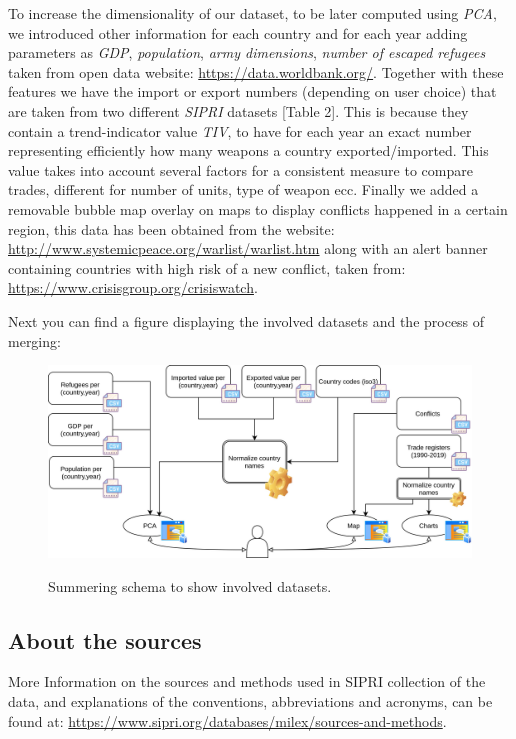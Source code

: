 \documentclass{article}
\begin{document}
\begin{multicols}{2}
To increase the dimensionality of our dataset, to be later computed using \textit{PCA}, we introduced other information for each country and for each year adding parameters as \textit{GDP}, \textit{population}, \textit{army dimensions}, \textit{number of escaped refugees} taken from open data website: \url{https://data.worldbank.org/}. 
Together with these features we have the import or export numbers (depending on user choice) that are taken from two different \textit{SIPRI} datasets [Table 2]. This is because they contain a trend-indicator value \textit{TIV}, to have for each year an exact number representing efficiently how many weapons a country exported/imported. This value takes into account several factors for a consistent measure to compare trades, different for number of units, type of weapon ecc.
Finally we added a removable bubble map overlay on maps to display conflicts happened in a certain region, this data has been obtained from the website: \url{http://www.systemicpeace.org/warlist/warlist.htm} along with an alert banner containing countries with high risk of a new conflict, taken from:  \url{https://www.crisisgroup.org/crisiswatch}.  





Next you can find a figure displaying the involved datasets and the process of merging:

\begin{figure}[H]

		\centering
	\includegraphics[scale=0.07,center]{./fig/vaBigDataIcons2.jpg}
	\label{fig:vaBigData}
	\caption{Summering schema to show involved datasets.}
	
	\end{figure}

\subsection{About the sources}
More Information on the sources and methods used in SIPRI collection of the data, and explanations of the conventions, abbreviations and acronyms, can be found at: \url{https://www.sipri.org/databases/milex/sources-and-methods}.



\end{multicols}
\end{document}
